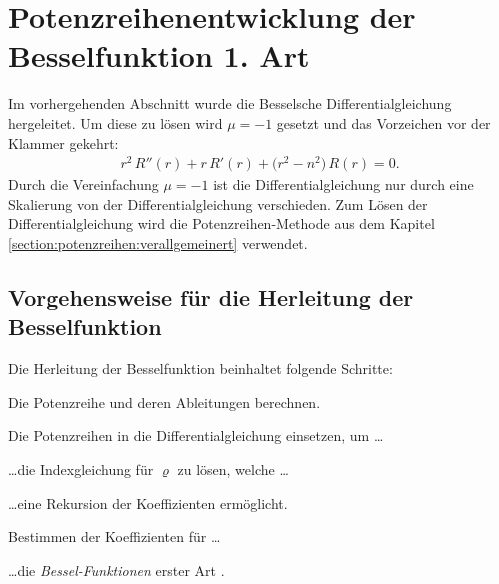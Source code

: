 \section[Potenzreihenentwicklung der Besselfunktion]{Potenzreihenentwicklung der Besselfunktion 1. Art
\label{kreis:teil2}}
Im vorhergehenden Abschnitt wurde die Besselsche Differentialgleichung  hergeleitet.
Um diese zu l\"osen wird $\mu = - 1$ gesetzt und das Vorzeichen vor der Klammer gekehrt:
\begin{align}
	r^2 \, R'' \left( r \right)
	+
	r \, R' \left( r \right)
	+
	\big( r^2 - n^2 \big) \, R \left( r \right)
	=
	0
	\label{eq:bessel:dgl}
	\text{.}
\end{align}
Durch die Vereinfachung $\mu = -1$ ist die Differentialgleichung  nur durch eine Skalierung von der Differentialgleichung  verschieden.
Zum L\"osen der Differentialgleichung  wird die Potenzreihen-Methode aus dem Kapitel \ref{section:potenzreihen:verallgemeinert} verwendet.
\subsection{Vorgehensweise f\"ur die Herleitung der Besselfunktion}
Die Herleitung der Besselfunktion beinhaltet folgende Schritte:
\begin{compactenum}
	\item Die Potenzreihe und deren Ableitungen berechnen.
	\item Die Potenzreihen in die Differentialgleichung  einsetzen, um \dots
	\item \dots die Indexgleichung f\"ur $\varrho$ zu l\"osen, welche \dots
	\item \dots eine Rekursion der Koeffizienten erm\"oglicht.
	\item Bestimmen der Koeffizienten f\"ur \dots
	\item \dots die \emph{Bessel-Funktionen} erster Art .
\end{compactenum}
\setcounter{stepCounter}{1}
